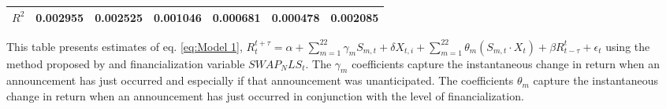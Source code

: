 \begin{sidewaystable}
{\begin{tabular}{@{}lllllllllllll@{}}
\textbf{$R^2$}             &\multicolumn{2}{c}{ 0.002955 }                                                 & \multicolumn{2}{c}{ 0.002525 }                                                 & \multicolumn{2}{c}{ 0.001046 }                                                 & \multicolumn{2}{c}{ 0.000681 }                                                 & \multicolumn{2}{c}{ 0.000478 }                                                   & \multicolumn{2}{c}{ 0.002085 }                                                 \\ \bottomrule 
\end{tabular}
}
\begin{tablenotes}\item 
    \singlespacing
    \footnotesize
    This table presents estimates of eq. \ref{eq:Model 1}, $R_{t}^{t+\tau}=\alpha+\sum_{m=1}^{22} \gamma_m S_{m,t}+ \delta X_{t,i} + \sum_{m=1}^{22} \theta_m (S_{m,t} \cdot X_t)+\beta R_{t-\tau}^{t}+\epsilon_{t}$ using the method proposed by \citet{kurov2019price} and financialization variable $SWAP_NLS_t$. The $\gamma_m$ coefficients capture the instantaneous change in return when an announcement has just occurred and especially if that announcement was unanticipated. The coefficients $\theta_m$ capture the instantaneous change in return when an announcement has just occurred in conjunction with the level of financialization.
\end{tablenotes}
\end{sidewaystable}

